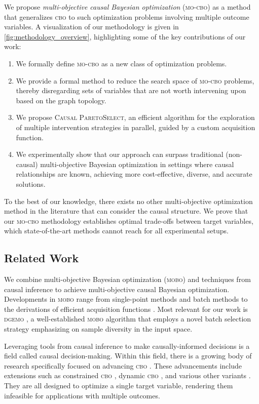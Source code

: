 We propose \textit{multi-objective causal Bayesian optimization} (\textsc{mo-cbo}) as a method that generalizes \textsc{cbo} to such optimization problems involving multiple outcome variables. A visualization of our methodology is given in \cref{fig:methodology_overview}, highlighting some of the key contributions of our work:

\begin{enumerate}[left=0pt]
    \item We formally define \textsc{mo-cbo} as a new class of optimization problems.
    \item We provide a formal method to reduce the search space of \textsc{mo-cbo} problems, thereby disregarding sets of variables that are not worth intervening upon based on the graph topology. 
    \item We propose \textsc{Causal ParetoSelect}, an efficient algorithm for the exploration of multiple intervention strategies in parallel, guided by a custom acquisition function.
    \item We experimentally show that our approach can surpass traditional (non-causal) multi-objective Bayesian optimization in settings where causal relationships are known, achieving more cost-effective, diverse, and accurate solutions.
\end{enumerate}


To the best of our knowledge, there exists no other multi-objective optimization method in the literature that can consider the causal structure. We prove that our \textsc{mo-cbo} methodology establishes optimal trade-offs between target variables,  which state-of-the-art methods cannot reach for all experimental setups.

\subsection{Related Work}
We combine multi-objective Bayesian optimization (\textsc{mobo}) and techniques from causal inference to achieve multi-objective causal Bayesian optimization.
Developments in \textsc{mobo} range from single-point methods \cite{ParEGO, PAL, USeMO} and batch methods \cite{MOEA/D-EGO, dgemo, qNEHVI} to the derivations of efficient acquisition functions \cite{EHVI,PES}. 
Most relevant for our work is \textsc{dgemo} \cite{dgemo}, a well-established \textsc{mobo} algorithm that employs a novel batch selection strategy emphasizing on sample diversity in the input space.

Leveraging tools from causal inference to make causally-informed decisions is a field called causal decision-making. Within this field, there is a growing body of research specifically focused on advancing \textsc{cbo} \cite{CBO}. These advancements include extensions such as constrained \textsc{cbo} \cite{pmlr-v202-aglietti23a}, dynamic \textsc{cbo} \cite{NEURIPS2021_577bcc91}, and various other variants \cite{pmlr-v206-branchini23a, pmlr-v216-gultchin23a, sussex2023modelbasedcausalbayesianoptimization, sussex2023adversarialcausalbayesianoptimization, cbo_exogenous_learning, causal_elicitation}. They are all designed to optimize a single target variable, rendering them infeasible for applications with multiple outcomes.
